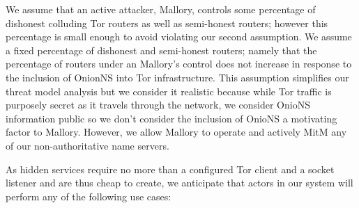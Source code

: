 \documentclass[USenglish,oneside,twocolumn]{article}
\begin{document}
We assume that an active attacker, Mallory, controls some percentage of dishonest colluding Tor routers as well as semi-honest routers; however this percentage is small enough to avoid violating our second assumption. We assume a fixed percentage of dishonest and semi-honest routers; namely that the percentage of routers under an Mallory's control does not increase in response to the inclusion of OnionNS into Tor infrastructure. This assumption simplifies our threat model analysis but we consider it realistic because while Tor traffic is purposely secret as it travels through the network, we consider OnioNS information public so we don't consider the inclusion of OnioNS a motivating factor to Mallory. However, we allow Mallory to operate and actively MitM any of our non-authoritative name servers.





As hidden services require no more than a configured Tor client and a socket listener and are thus cheap to create, we anticipate that actors in our system will perform any of the following use cases:
\end{document}
